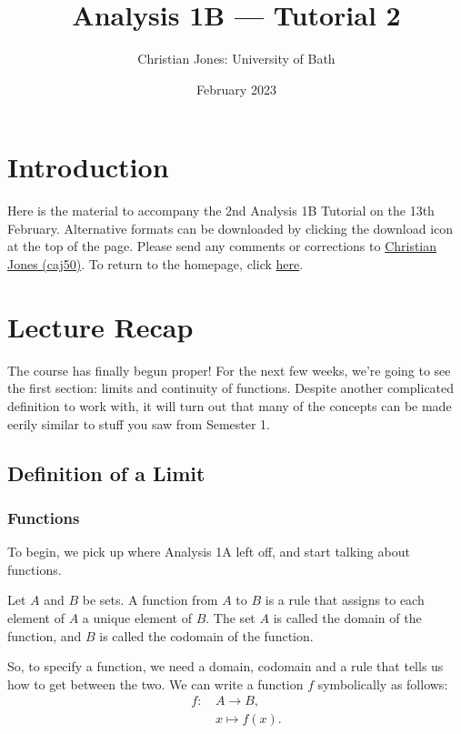 \documentclass[
  12pt,
  a4paper]{extarticle}
\title{Analysis 1B --- Tutorial 2}
\author{Christian Jones: University of Bath}
\date{February 2023}
\theoremstyle{plain}
\theoremstyle{definition}
\theoremstyle{plain}
\theoremstyle{plain}
\theoremstyle{plain}
\theoremstyle{plain}
\theoremstyle{definition}
\theoremstyle{definition}
\theoremstyle{remark}
\theoremstyle{remark}
\let\BeginKnitrBlock\begin \let\EndKnitrBlock\end
\renewcommand{\;}{\,}
\begin{document}
\maketitle

{
\setcounter{tocdepth}{2}
\tableofcontents
}
\newpage
{}

\hypertarget{introduction}{%
\section*{Introduction}\label{introduction}}

Here is the material to accompany the 2nd Analysis 1B Tutorial on the 13th February. Alternative formats can be downloaded by clicking the download icon at the top of the page. Please send any comments or corrections to \href{mailto:caj50@bath.ac.uk}{Christian Jones (caj50)}. To return to the homepage, click \href{http://caj50.github.io/tutoring.html}{here}.

\hypertarget{lecture-recap}{%
\section{Lecture Recap}\label{lecture-recap}}

The course has finally begun proper! For the next few weeks, we're going to see the first section: limits and continuity of functions. Despite another complicated definition to work with, it will turn out that many of the concepts can be made eerily similar to stuff you saw from Semester 1.

\hypertarget{definition-of-a-limit}{%
\subsection{Definition of a Limit}\label{definition-of-a-limit}}

\hypertarget{functions}{%
\subsubsection{Functions}\label{functions}}

To begin, we pick up where Analysis 1A left off, and start talking about functions.
\BeginKnitrBlock{definition}[Function]
{\label{def:def1} }Let \(A\) and \(B\) be sets. A function from \(A\) to \(B\) is a rule that assigns to each element of \(A\) a unique element of \(B\). The set \(A\) is called the domain of the function, and \(B\) is called the codomain of the function.
\EndKnitrBlock{definition}
So, to specify a function, we need a domain, codomain and a rule that tells us how to get between the two. We can write a function \(f\) symbolically as follows:
\begin{align*}
f:\; &A \longrightarrow B,\\
&x \longmapsto f(x).
\end{align*}
\end{document}
